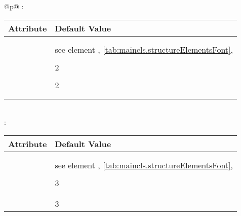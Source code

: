 \begin{longtable}{@{}p{\columnwidth}@{}}
    \addlinespace[\normalbaselineskip]
    : \\*
    \begin{tabularx}{\linewidth}{ll}
    \toprule
    Attribute & Default Value \\
    \midrule\nopagebreak
    \PValue{afterskip}   & \PValue{1.5ex plus .2ex} \\
    \PValue{beforeskip}  & \PValue{-3.25ex plus -1ex minus -.2ex} \\
    \PValue{font}        & see element 
                           \DescRef{maincls.fontelement.subsection},
                           \autoref{tab:maincls.structureElementsFont}, 
                           \autopageref{tab:maincls.structureElementsFont} \\
    \PValue{indent}      & \PValue{0pt} \\
    \PValue{level}       & 2 \\
    \PValue{tocindent}   & \PValue{3.8em}\\
    \PValue{toclevel}    & 2 \\
    \PValue{tocnumwidth} & \PValue{3.2em}\\
    \PValue{tocstyle}    & \PValue{section} \\
    \bottomrule
    \end{tabularx} \\
    \addlinespace[\normalbaselineskip]
    : \\*
    \begin{tabularx}{\linewidth}{ll}
    \toprule
    Attribute & Default Value \\
    \midrule\nopagebreak
    \PValue{afterskip}   & \PValue{1.5ex plus .2ex} \\
    \PValue{beforeskip}  & \PValue{-3.25ex plus -1ex minus -.2ex} \\
    \PValue{font}        & see element 
                           \DescRef{maincls.fontelement.subsubsection},
                           \autoref{tab:maincls.structureElementsFont}, 
                           \autopageref{tab:maincls.structureElementsFont} \\
    \PValue{indent}      & \PValue{0pt} \\
    \PValue{level}       & 3 \\
    \PValue{tocindent}   & \PValue{7.0em}\\
    \PValue{tocnumwidth} & \PValue{4.1em}\\
    \PValue{toclevel}    & 3 \\

\end{tabularx}
\end{longtable}
